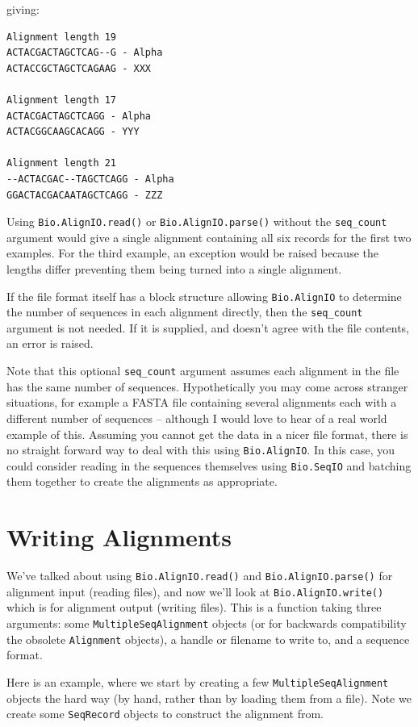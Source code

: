 \documentclass{report}
\begin{document}
\noindent giving:

\begin{verbatim}
Alignment length 19
ACTACGACTAGCTCAG--G - Alpha
ACTACCGCTAGCTCAGAAG - XXX

Alignment length 17
ACTACGACTAGCTCAGG - Alpha
ACTACGGCAAGCACAGG - YYY

Alignment length 21
--ACTACGAC--TAGCTCAGG - Alpha
GGACTACGACAATAGCTCAGG - ZZZ
\end{verbatim}

Using \verb|Bio.AlignIO.read()| or \verb|Bio.AlignIO.parse()| without the \verb|seq_count| argument would give a single alignment containing all six records for the first two examples.  For the third example, an exception would be raised because the lengths differ preventing them being turned into a single alignment.

If the file format itself has a block structure allowing \verb|Bio.AlignIO| to determine the number of sequences in each alignment directly, then the \verb|seq_count| argument is not needed.  If it is supplied, and doesn't agree with the file contents, an error is raised.

Note that this optional \verb|seq_count| argument assumes each alignment in the file has the same number of sequences.  Hypothetically you may come across stranger situations, for example a FASTA file containing several alignments each with a different number of sequences -- although I would love to hear of a real world example of this.  Assuming you cannot get the data in a nicer file format, there is no straight forward way to deal with this using \verb|Bio.AlignIO|.  In this case, you could consider reading in the sequences themselves using \verb|Bio.SeqIO| and batching them together to create the alignments as appropriate.

\section{Writing Alignments}

We've talked about using \verb|Bio.AlignIO.read()| and \verb|Bio.AlignIO.parse()| for alignment input (reading files), and now we'll look at \verb|Bio.AlignIO.write()| which is for alignment output (writing files).  This is a function taking three arguments: some \verb|MultipleSeqAlignment| objects (or for backwards compatibility the obsolete \verb|Alignment| objects), a handle or filename to write to, and a sequence format.

Here is an example, where we start by creating a few \verb|MultipleSeqAlignment| objects the hard way (by hand, rather than by loading them from a file).
Note we create some \verb|SeqRecord| objects to construct the alignment from.
\end{document}
